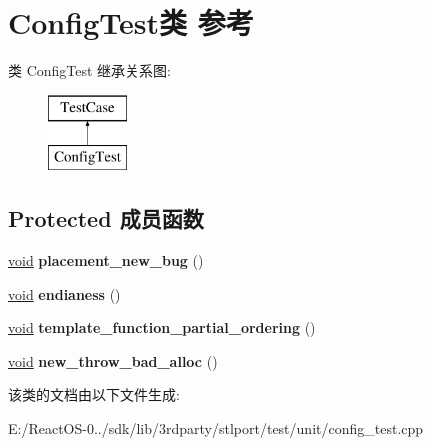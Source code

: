 \hypertarget{class_config_test}{}\section{Config\+Test类 参考}
\label{class_config_test}
类 Config\+Test 继承关系图\+:\begin{figure}[H]
\begin{center}
\leavevmode
\includegraphics[height=2.000000cm]{class_config_test}
\end{center}
\end{figure}
\subsection*{Protected 成员函数}
\begin{DoxyCompactItemize}
\item 
\mbox{\label{class_config_test_a3b72cd7001563e7f9f70a0bbbefb85e3}} 
\hyperlink{interfacevoid}{void} {\bfseries placement\+\_\+new\+\_\+bug} ()
\item 
\mbox{\label{class_config_test_a96d45ba567cefdeb5af9e91448b5684a}} 
\hyperlink{interfacevoid}{void} {\bfseries endianess} ()
\item 
\mbox{\label{class_config_test_a4ed42209f1d5b29acacb9084662f0caf}} 
\hyperlink{interfacevoid}{void} {\bfseries template\+\_\+function\+\_\+partial\+\_\+ordering} ()
\item 
\mbox{\label{class_config_test_a9fbba1a6f1e3006a329b92f649561239}} 
\hyperlink{interfacevoid}{void} {\bfseries new\+\_\+throw\+\_\+bad\+\_\+alloc} ()
\end{DoxyCompactItemize}


该类的文档由以下文件生成\+:\begin{DoxyCompactItemize}
\item 
E\+:/\+React\+O\+S-\/0../sdk/lib/3rdparty/stlport/test/unit/config\+\_\+test.\+cpp\end{DoxyCompactItemize}
